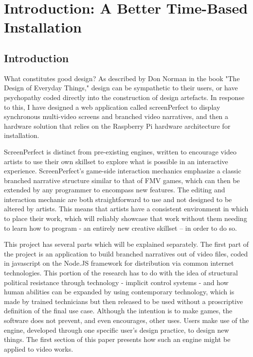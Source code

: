 \chapter{Introduction: A Better Time-Based Installation}\thispagestyle{empty} %

\label{Chapter1} %

\section{Introduction}
What constitutes good design? As described by Don Norman in the book "The Design of Everyday Things," \parencite{norman} design can be sympathetic to their users, or have psychopathy coded directly into the construction of design artefacts. In response to this, I have designed a web application called screenPerfect to display synchronous multi-video screens and branched video narratives, and then a hardware solution that relies on the Raspberry Pi hardware architecture for installation. 

ScreenPerfect is distinct from pre-existing engines, written to encourage video artists to use their own skillset to explore what is possible in an interactive experience. ScreenPerfect's game-side interaction mechanics emphasize a classic branched narrative structure similar to that of FMV games, which can then be extended by any programmer to encompass new features. The editing and interaction mechanic are both straightforward to use and not designed to be altered by artists. This means that artists have a consistent environment in which to place their work, which will reliably showcase that work without them needing to learn how to program - an entirely new creative skillset – in order to do so.

This project has several parts which will be explained separately. The first part of the project is an application to build branched narratives out of video files, coded in javascript on the Node.JS framework for distribution via common internet technologies. This portion of the research has to do with the idea of structural political resistance through technology - implicit control systems - and how human abilities can be expanded by using contemporary technology, which is made by trained technicians but then released to be used without a proscriptive definition of the final use case. Although the intention is to make games, the software does not prevent, and even encourages, other uses. Users make use of the engine, developed through one specific user's design practice, to design new things. The first section of this paper presents how such an engine might be applied to video works.

